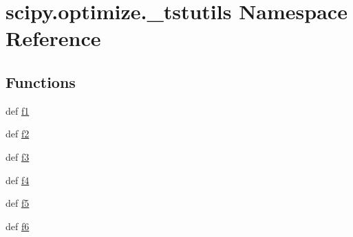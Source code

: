 \hypertarget{namespacescipy_1_1optimize_1_1__tstutils}{}\section{scipy.\+optimize.\+\_\+tstutils Namespace Reference}
\label{namespacescipy_1_1optimize_1_1__tstutils}
\subsection*{Functions}
\begin{DoxyCompactItemize}
\item 
def \hyperlink{namespacescipy_1_1optimize_1_1__tstutils_a01c628c49e2e6245b573f4e6c5efd7c0}{f1}
\item 
def \hyperlink{namespacescipy_1_1optimize_1_1__tstutils_a490de1cecf64fc883489ffb7762d5824}{f2}
\item 
def \hyperlink{namespacescipy_1_1optimize_1_1__tstutils_aec51111ac95cfec81205fa3ddb0acc87}{f3}
\item 
def \hyperlink{namespacescipy_1_1optimize_1_1__tstutils_a9cf93109bffb4195560c17bee674131d}{f4}
\item 
def \hyperlink{namespacescipy_1_1optimize_1_1__tstutils_a369e02bc581cf1afeb77949c50db4628}{f5}
\item 
def \hyperlink{namespacescipy_1_1optimize_1_1__tstutils_a555c55c934a9d35c8003ae390952698a}{f6}
\end{DoxyCompactItemize}

